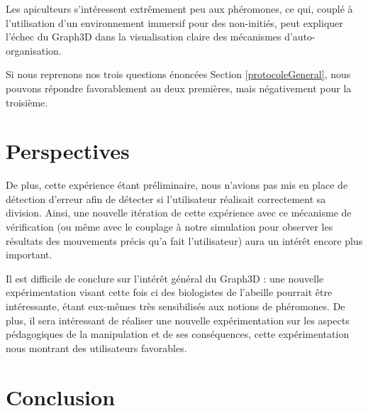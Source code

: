 Les apiculteurs s'intéressent extrêmement peu aux phéromones, ce qui, couplé à l'utilisation d'un environnement immersif pour des non-initiés, peut expliquer l'échec du Graph3D dans la visualisation claire des mécanismes d'auto-organisation.

	Si nous reprenons nos trois questions énoncées Section \ref{protocoleGeneral}, nous pouvons répondre favorablement au deux premières, mais négativement pour la troisième.

	
	\section{Perspectives}
 De plus, cette expérience étant préliminaire, nous n'avions pas mis en place de détection d'erreur afin de détecter si l'utilisateur réalisait correctement sa division. Ainsi, une nouvelle itération de cette expérience avec ce mécanisme de vérification (ou même avec le couplage à notre simulation pour observer les résultats des mouvements précis qu'a fait l'utilisateur) aura un intérêt encore plus important.

Il est difficile de conclure sur l'intérêt général du Graph3D : une nouvelle expérimentation visant cette fois ci des biologistes de l'abeille pourrait être intéressante, étant eux-mêmes très sensibilisés aux notions de phéromones.
De plus, il sera intéressant de réaliser une nouvelle expérimentation sur les aspects pédagogiques de la manipulation et de ses conséquences, cette expérimentation nous montrant des utilisateurs favorables.
			
	\section*{Conclusion}
	